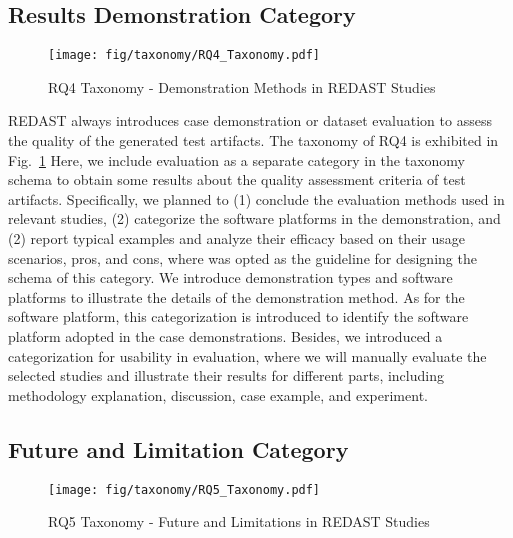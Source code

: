 \subsection{Results Demonstration Category}
\begin{figure}[!t]
    \centering
    \texttt{[image: fig/taxonomy/RQ4\_Taxonomy.pdf]}
    \caption{RQ4 Taxonomy - Demonstration Methods in REDAST Studies}
    \label{fig:RQ4_taxonomy}
\end{figure}
REDAST always introduces case demonstration or dataset evaluation to assess the quality of the generated test artifacts. The taxonomy of RQ4 is exhibited in Fig.~\ref{fig:RQ4_taxonomy} Here, we include evaluation as a separate category in the taxonomy schema to obtain some results about the quality assessment criteria of test artifacts. Specifically, we planned to (1) conclude the evaluation methods used in relevant studies, (2) categorize the software platforms in the demonstration, and (2) report typical examples and analyze their efficacy based on their usage scenarios, pros, and cons, where \cite{evaluation_taxonomy} was opted as the guideline for designing the schema of this category. We introduce demonstration types and software platforms to illustrate the details of the demonstration method. As for the software platform, this categorization is introduced to identify the software platform adopted in the case demonstrations. Besides, we introduced a categorization for usability in evaluation, where we will manually evaluate the selected studies and illustrate their results for different parts, including methodology explanation, discussion, case example, and experiment.

\subsection{Future and Limitation Category}
\label{sec:rq5_taxonomy}
\begin{figure}[!t]
    \centering
    \texttt{[image: fig/taxonomy/RQ5\_Taxonomy.pdf]}
    \caption{RQ5 Taxonomy - Future and Limitations in REDAST Studies}
    \label{fig:RQ5_taxonomy}
\end{figure}

